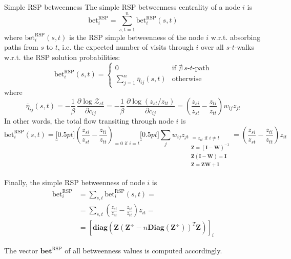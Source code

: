 \documentclass[13pt]{beamer}
\begin{document}
    \begin{frame}[t,allowframebreaks]{Simple RSP betweenness}
    The simple RSP betweenness centrality of a node $i$ is
    \begin{equation*}
    \text{bet}_i^{\text{RSP}}=\sum_{s,t=1}^n \text{bet}_i^{\text{RSP}}(s,t)
    \end{equation*}
    where $\text{bet}_i^{\text{RSP}}(s,t)$ is the RSP simple betweenness of the node $i$ w.r.t. absorbing paths from $s$ to $t$, i.e. the expected number of visits through $i$ over all $s$-$t$-walks w.r.t. the RSP solution probabilities:
    \begin{equation*}
    \text{bet}_i^{\text{RSP}}(s,t)=
    \begin{cases}
    0 &\text{if }\nexists\ s\text{-}t\text{-path}\\
    \displaystyle\sum_{j=1}^n\overline{\eta}_{ij}(s,t) &\text{otherwise}
    \end{cases}
    \end{equation*} 
    where 
    \begin{equation*}
    \overline{\eta}_{ij}(s,t)=-\frac{1}{\beta}\,\frac{\partial\log \mathcal{Z}_{st}}{\partial c_{ij}}=-\frac{1}{\beta}\,\frac{\partial\log\left(z_{st}/z_{tt}\right) }{\partial c_{ij}}=\left(\frac{z_{si}}{z_{st}}-\frac{z_{ti}}{z_{tt}}\right)w_{ij}z_{jt}
    \end{equation*}
    In other words, the total flow transiting through node $i$ is
    \begin{equation*}
    \text{bet}_i^{\text{RSP}}(s,t)=\underbracket[0.5pt]{\left(\frac{z_{si}}{z_{st}}-\frac{z_{ti}}{z_{tt}}\right)}_{=0\text{ if }i=t}\underbracket[0.5pt]{\sum_{j} w_{ij}z_{jt}}_{\begin{gathered}
    \scriptstyle{=z_{it}\text{ if }i\neq t} \\
    \scriptstyle{\mathbf{Z}=(\mathbf{I}-\mathbf{W})^{-1}} \\
    \scriptstyle{\mathbf{Z}(\mathbf{I}-\mathbf{W})=\mathbf{I}} \\
    \scriptstyle{\mathbf{Z}=\mathbf{ZW}+\mathbf{I}} \\
    \end{gathered}}=\left(\frac{z_{si}}{z_{st}}-\frac{z_{ti}}{z_{tt}}\right)z_{it}
    \end{equation*}

    Finally, the simple RSP betweenness of node $i$ is
    \begin{align*}
    \text{bet}_i^{\text{RSP}}&=\sum_{s,t}\text{bet}_i^{\text{RSP}}(s,t)=\\
    &=\sum_{s,t} \left(\frac{z_{si}}{z_{st}}-\frac{z_{ti}}{z_{tt}}\right)z_{it}=\\
    &=\left[ \textbf{diag}\left( \mathbf{Z} \left(\mathbf{Z}^\div-n \textbf{Diag}\left( \mathbf{Z}^\div \right) \right)^T\mathbf{Z} \right) \right]_i
    \end{align*}


    The vector $\textbf{bet}^\text{RSP}$ of all betweenness values is computed accordingly.
    \end{frame}
\end{document}
